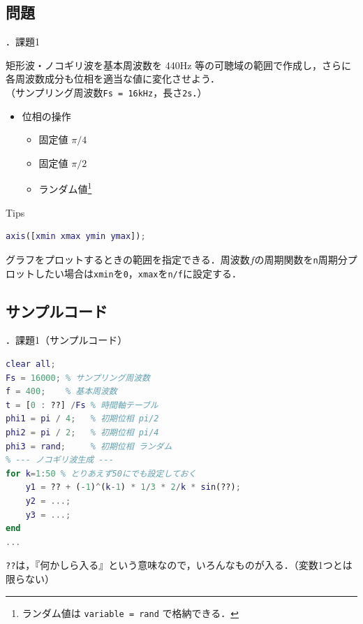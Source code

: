 \documentclass[aspectratio=43]{beamer}
\newcommand{\showsec}{\thesection ．}
\begin{document}
\subsection{問題}
\begin{frame}[t,containsverbatim]{\showsec 課題1}
    \begin{exampleblock}{}
        矩形波・ノコギリ波を基本周波数を 440Hz 等の可聴域の範囲で作成し，さらに各周波数成分も位相を適当な値に変化させよう．\\
        （サンプリング周波数\verb|Fs = 16kHz|，長さ\verb|2s|．）
        \begin{itemize}
            \item 位相の操作
                  \begin{itemize}
                      \item 固定値 \(\pi/4\)
                      \item 固定値 \(\pi/2\)
                      \item ランダム値\footnote{ランダム値は \texttt{variable = rand} で格納できる．}
                  \end{itemize}
        \end{itemize}
    \end{exampleblock}
    \begin{block}{Tips}
        \begin{lstlisting}[language={Matlab},numbers={none},frame={none},xleftmargin=0em]
axis([xmin xmax ymin ymax]);
        \end{lstlisting}
        グラフをプロットするときの範囲を指定できる．周波数\(f\)の周期関数を\texttt{n}周期分プロットしたい場合は\texttt{xmin}を\texttt{0}，\texttt{xmax}を\texttt{n/f}に設定する．
    \end{block}
\end{frame}
\subsection{サンプルコード}
\begin{frame}[t,containsverbatim]{\showsec 課題1（サンプルコード）}
    \begin{lstlisting}[language={Matlab}]
clear all;
Fs = 16000; % サンプリング周波数
f = 400;    % 基本周波数
t = [0 : ??] /Fs % 時間軸テーブル
phi1 = pi / 4;   % 初期位相 pi/2
phi2 = pi / 2;   % 初期位相 pi/4
phi3 = rand;     % 初期位相 ランダム
% --- ノコギリ波生成 ---
for k=1:50 % とりあえず50にでも設定しておく
    y1 = ?? + (-1)^(k-1) * 1/3 * 2/k * sin(??);
    y2 = ...;
    y3 = ...;
end
...
\end{lstlisting}
    \begin{block}{}
        \texttt{??}は，『何かしら入る』という意味なので，いろんなものが入る．（変数1つとは限らない）
    \end{block}
\end{frame}
\end{document}
